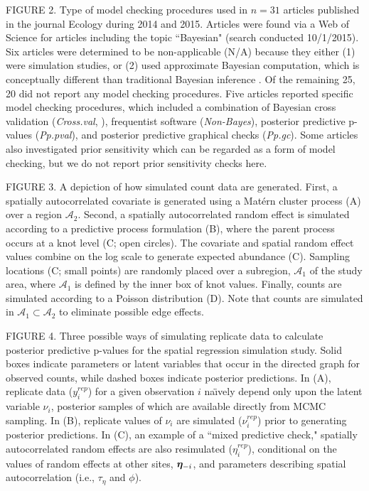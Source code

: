 \documentclass[12pt,english]{article}
\begin{document}
\begin{spacing}{1.9}
FIGURE 2.  Type of model checking procedures used in $n=31$ articles published in the journal Ecology during 2014 and 2015. Articles were found via a Web of Science for articles including the topic ``Bayesian" (search conducted 10/1/2015).  Six articles were determined to be non-applicable (N/A) because they either (1) were simulation studies, or (2) used approximate Bayesian computation, which is conceptually different than traditional Bayesian inference \citep[see e.g.][]{BeaumontEtAl2002}.  Of the remaining 25, 20 did not report any model checking procedures.  Five articles reported specific model checking procedures, which included a combination of Bayesian cross validation (\textit{Cross.val}, ), frequentist software (\textit{Non-Bayes}), posterior predictive p-values (\textit{Pp.pval}), and posterior predictive graphical checks (\textit{Pp.gc}).  Some articles also investigated prior sensitivity which can be regarded as a form of model checking, but we do not report prior sensitivity checks here.

FIGURE 3.  A depiction of how simulated count data are generated.  First, a spatially autocorrelated covariate is generated using a Mat\'{e}rn cluster process (A) over a region $\mathcal{A}_2$.  Second, a spatially autocorrelated random effect is simulated according to a predictive process formulation (B), where the parent process occurs at a knot level (C; open circles).  The covariate and spatial random effect values combine on the log scale to generate expected abundance (C).  Sampling locations (C; small points) are randomly placed over a subregion, $\mathcal{A_1}$ of the study area, where $\mathcal{A_1}$ is defined by the inner box of knot values. Finally, counts are simulated according to a Poisson distribution (D).  Note that counts are simulated in $\mathcal{A}_1 \subset \mathcal{A}_2$ to eliminate possible edge effects.

FIGURE 4.  Three possible ways of simulating replicate data to calculate posterior predictive p-values for the spatial regression simulation study. Solid boxes indicate parameters or latent variables that occur in the directed graph for observed counts, while dashed boxes indicate posterior predictions.  In (A), replicate data ($y_i^{rep}$) for a given observation $i$ na\"{\i}vely depend only upon the latent variable $\nu_i$, posterior samples of which are available directly from MCMC sampling.  In (B), replicate values of $\nu_i$ are simulated ($\nu_i^{rep}$) prior to generating posterior predictions.  In (C), an example of a ``mixed predictive check," spatially autocorrelated random effects are also resimulated ($\eta_i^{rep}$), conditional on the values of random effects at other sites, $\boldsymbol{\eta}_{-i}$, and parameters describing spatial autocorrelation (i.e., $\tau_\eta$ and $\phi$).


\end{spacing}
\end{document}
